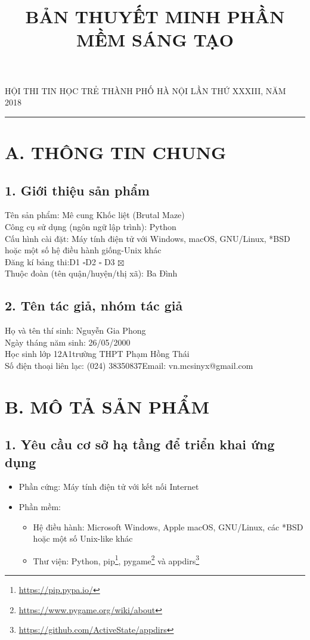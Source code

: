 \documentclass[a4paper,12pt]{article}
\title{BẢN THUYẾT MINH PHẦN MỀM SÁNG TẠO}
\author{}
\date{}
\begin{document}
\begin{center}
HỘI THI TIN HỌC TRẺ THÀNH PHỐ HÀ NỘI LẦN THỨ XXXIII, NĂM 2018
\rule{0.8\textwidth}{0.4pt}
\end{center}
{\let\newpage\relax\maketitle}
\section*{A. THÔNG TIN CHUNG}
\subsection*{1. Giới thiệu sản phẩm}
Tên sản phẩm: Mê cung Khốc liệt (Brutal Maze)\\
Công cụ sử dụng (ngôn ngữ lập trình): Python\\
Cấu hình cài đặt: Máy tính điện tử với Windows, macOS, GNU/Linux, *BSD hoặc một
số hệ điều hành giống-Unix khác\\
Đăng kí bảng thi:\hspace{1cm}D1 $\square$\hspace{1in}D2 $\square$
\hspace{1in}D3 $\boxtimes$\\
Thuộc đoàn (tên quận/huyện/thị xã): Ba Đình

\subsection*{2. Tên tác giả, nhóm tác giả}
Họ và tên thí sinh: Nguyễn Gia Phong\\
Ngày tháng năm sinh: 26/05/2000\\
Học sinh lớp 12A1\hspace{1in}trường THPT Phạm Hồng Thái\\
Số điện thoại liên lạc: (024) 38350837\hspace{1in}Email: vn.mcsinyx@gmail.com

\section*{B. MÔ TẢ SẢN PHẨM}
\subsection*{1. Yêu cầu cơ sở hạ tầng để triển khai ứng dụng}
\begin{itemize}
  \item Phần cứng: Máy tính điện tử với kết nối Internet
  \item Phần mềm:
    \begin{itemize}
      \item Hệ điều hành: Microsoft Windows, Apple macOS, GNU/Linux, các *BSD
        hoặc một số Unix-like khác
      \item Thư viện: Python, pip\footnote{\url{https://pip.pypa.io/}},
        pygame\footnote{\url{https://www.pygame.org/wiki/about}} và
        appdirs\footnote{\url{https://github.com/ActiveState/appdirs}}
    \end{itemize}
\end{itemize}
\end{document}
